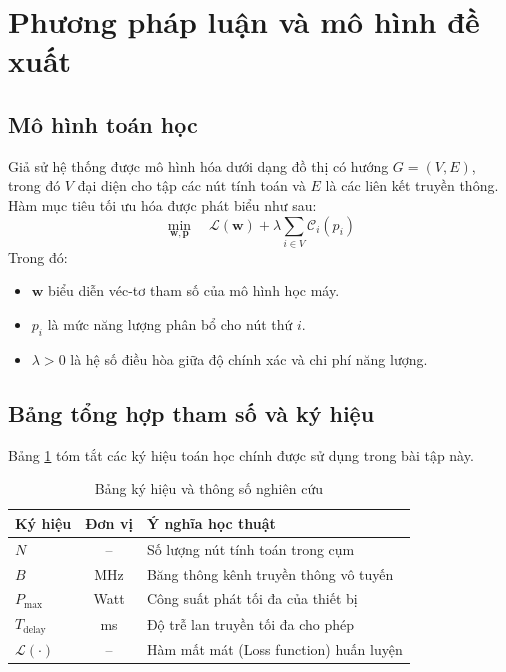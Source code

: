 \section{Phương pháp luận và mô hình đề xuất}
\label{sec:phuong_phap}

\subsection{Mô hình toán học}
Giả sử hệ thống được mô hình hóa dưới dạng đồ thị có hướng $G = (V, E)$, trong đó $V$ đại diện cho tập các nút tính toán và $E$ là các liên kết truyền thông. Hàm mục tiêu tối ưu hóa được phát biểu như sau:
\begin{equation}
  \min_{\mathbf{w}, \mathbf{p}} \quad \mathcal{L}(\mathbf{w}) + \lambda \sum_{i \in V} \mathcal{C}_i(p_i)
  \label{eq:objective}
\end{equation}
Trong đó:
\begin{itemize}
  \item $\mathbf{w}$ biểu diễn véc-tơ tham số của mô hình học máy.
  \item $p_i$ là mức năng lượng phân bổ cho nút thứ $i$.
  \item $\lambda > 0$ là hệ số điều hòa giữa độ chính xác và chi phí năng lượng.
\end{itemize}

\subsection{Bảng tổng hợp tham số và ký hiệu}
Bảng \ref{tab:notation} tóm tắt các ký hiệu toán học chính được sử dụng trong bài tập này.

\begin{table}[H]
  \centering
  \caption{Bảng ký hiệu và thông số nghiên cứu}
  \label{tab:notation}
  \begin{tabularx}{\textwidth}{l c X}
    \toprule
    \textbf{Ký hiệu} & \textbf{Đơn vị} & \textbf{Ý nghĩa học thuật} \\
    \midrule
    $N$ & -- & Số lượng nút tính toán trong cụm \\
    $B$ & MHz & Băng thông kênh truyền thông vô tuyến \\
    $P_{\max}$ & Watt & Công suất phát tối đa của thiết bị \\
    $T_{\text{delay}}$ & ms & Độ trễ lan truyền tối đa cho phép \\
    $\mathcal{L}(\cdot)$ & -- & Hàm mất mát (Loss function) huấn luyện \\
    \bottomrule
  \end{tabularx}
\end{table}
